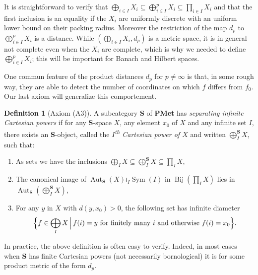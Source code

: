 \documentclass[a4paper]{article}
\theoremstyle{definition}
\newtheorem{defn}[lem]{Definition}
\DeclareMathOperator\Sym{Sym}
\DeclareMathOperator\Aut{Aut}
\DeclareMathOperator\Bij{Bij}
\newcommand*{\category}[1]{\textbf{#1}}
\newcommand*{\PMet}{\category{PMet}}
\newcommand*{\CatS}{\category{S}}
\newcommand{\setst}[2]{\{#1\ |\ #2\}}
\begin{document}
It is straightforward to verify that $\bigoplus_{i\in I} X_i\subseteq\bigoplus_{i\in I}^p X_i\subseteq\prod_{i\in I}X_i$ and that the first inclusion is an equality if the $X_i$ are uniformly discrete with an uniform lower bound on their packing radius.
Moreover the restriction of the map $d_p$ to $\bigoplus_{i\in I}^p X_i$ is a distance.
While $(\bigoplus_{i\in I} X_i, d_p)$ is a metric space, it is in general not complete even when the $X_i$ are complete, which is why we needed to define $\bigoplus_{i\in I}^p X_i$; this will be important for Banach and Hilbert spaces.

One commun feature of the product distances $d_p$ for $p\neq\infty$ is that, in some rough way, they are able to detect the number of coordinates on which $f$ differs from $f_0$.
Our last axiom will generalize this comportement.
%
%
\begin{defn}[Axiom (A3)]\label{Def:InfiniteCartesian}
A subcategory \CatS{} of \PMet{} has \emph{separating infinite Cartesian powers} if for any \CatS-space $X$, any element $x_0$ of $X$ and any infinite set $I$, there exists an \CatS-object, called the \emph{$I$\textsuperscript{th} Cartesian power of $X$} and written $\bigoplus_I ^\CatS X$, such that:
\begin{enumerate}
\item
As sets we have the inclusions $\bigoplus_I X\subseteq \bigoplus_I^\CatS X\subseteq \prod_I X$,
\item
The canonical image of $\Aut_{\CatS}(X)\wr_I \Sym(I)$ in $\Bij(\prod_I X)$ lies in $\Aut_{\CatS}(\bigoplus_I^\CatS X)$,
\item
For any $y$ in $X$ with $d(y,x_0)>0$, the following set has infinite diameter 
\[
	\Bigl\{f\in \bigoplus_I X\,\Big|\,f(i)=y \textnormal{ for finitely many } i \textnormal{ and otherwise }f(i)=x_0\Bigr\}.
\]
\end{enumerate}
\end{defn}
%
%
In practice, the above definition is often easy to verify.
Indeed, in most cases when \CatS{} has finite Cartesian powers (not necessarily bornological) it is for some product metric of the form $d_p$.
\end{document}
